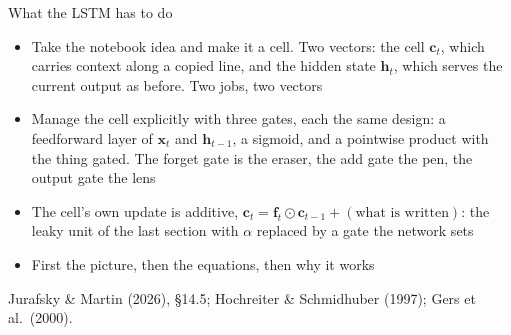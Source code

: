 \documentclass[aspectratio=169, 11pt]{beamer}
\newcommand{\srcline}[1]{%
  \par\vspace{0.25em}%
  {\scriptsize\color{mcMuted}\hfill #1\par}}
\newcommand{\src}[3]{}      %
\begin{document}
\begin{frame}{What the LSTM has to do}
  \src{jurafsky_slp3}{section}{14.5}
  \src{hochreiter1997}{section}{4.1}
  \vspace{0.05em}
  {\footnotesize
  \begin{itemize}\itemsep0.30em
    \item Take the notebook idea and make it a cell. Two vectors: the
          \alert{cell} $\mathbf{c}_t$, which carries context along a copied
          line, and the \alert{hidden state} $\mathbf{h}_t$, which serves the
          current output as before. Two jobs, two vectors
    \item Manage the cell explicitly with three gates, each the same
          design: a feedforward layer of $\mathbf{x}_t$ and $\mathbf{h}_{t-1}$, a
          sigmoid, and a pointwise product with the thing gated. The
          \alert{forget gate} is the eraser, the \alert{add gate} the pen,
          the \alert{output gate} the lens
    \item The cell's own update is additive,
          $\mathbf{c}_t = \mathbf{f}_t \odot \mathbf{c}_{t-1} + (\text{what is written})$:
          the leaky unit of the last section with $\alpha$ replaced by a
          gate the network sets
    \item First the picture, then the equations, then why it works
  \end{itemize}}
  \srcline{Jurafsky \& Martin (2026), \S14.5; Hochreiter \& Schmidhuber (1997); Gers et al.\ (2000).}
\end{frame}
\end{document}
